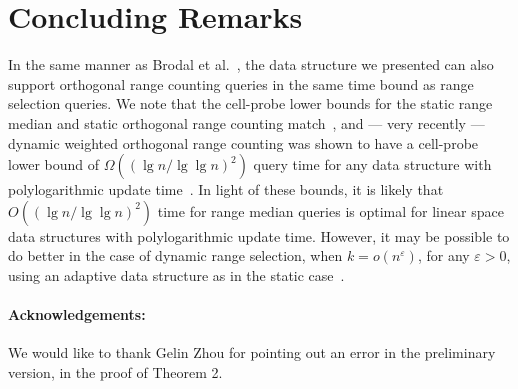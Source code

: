 \documentclass{llncs}
\begin{document}
\section{Concluding Remarks}
In the same manner as Brodal et al.~\cite{BGJS10}, the data structure
we presented can also support orthogonal range counting queries in the
same time bound as range selection queries.  We note that the
cell-probe lower bounds for the static range median and static
orthogonal range counting match~\cite{P07,JL11}, and --- very recently
--- dynamic weighted orthogonal range counting was shown to have a
cell-probe lower bound of $\Omega((\lg n / \lg \lg n)^2)$ query time
for any data structure with polylogarithmic update time~\cite{L11}.
In light of these bounds, it is likely that $O((\lg n / \lg \lg n)^2)$
time for range median queries is optimal for linear space data
structures with polylogarithmic update time.  However, it may be
possible to do better in the case of dynamic range selection, when $k
= o(n^\varepsilon)$, for any $\varepsilon > 0$, using an adaptive data
structure as in the static case~\cite{JL11}.

\paragraph{Acknowledgements:} We would like to thank Gelin Zhou for
pointing out an error in the preliminary version, in the proof of
Theorem 2.

 
\end{document}
